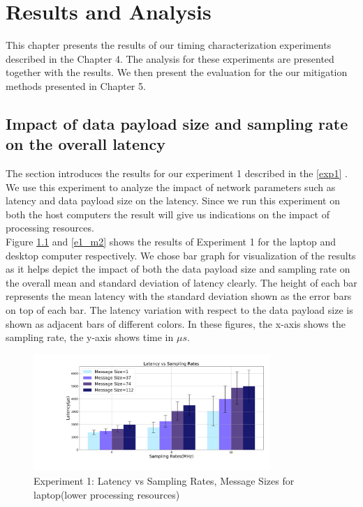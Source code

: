 \chapter{Results and Analysis}

This chapter presents the results of our timing characterization experiments described in the Chapter 4.
The analysis for these experiments are presented together with the results.
We then present the evaluation for the our mitigation methods presented in Chapter 5.

\section{Impact of data payload size and sampling rate on the overall latency}
The section introduces the results for our experiment 1 described in the \ref{exp1} . 
We use this experiment to analyze the impact of network parameters such as latency and data payload size on the latency.
Since we run this experiment on both the host computers the result will give us indications on the impact of processing resources.\\

Figure \ref{e1_m1} and \ref{e1_m2} shows the results of Experiment 1 for the laptop and desktop computer respectively.
We chose bar graph for visualization of the results as it helps depict the impact of both the data payload size and sampling rate on the overall mean and standard deviation of latency clearly.
The height of each bar represents the mean latency with the standard deviation shown as the error bars on top of each bar.
The latency variation with respect to the data payload size is shown as adjacent bars of different colors.
In these figures, the x-axis shows the sampling rate, the y-axis shows time in $\mu s$.\\

\begin{figure}[h!]
\centering
\includegraphics[width=0.8\textwidth]{Thesis/Figure/E1_M1.png}
\caption{Experiment 1: Latency vs Sampling Rates, Message Sizes for laptop(lower processing resources)}
\label{e1_m1}
\end{figure}

